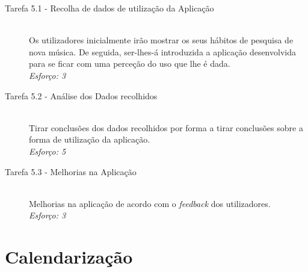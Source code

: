     \begin{description}
      \item[Tarefa 5.1 - Recolha de dados de utilização da Aplicação] \hfill \\
      Os utilizadores inicialmente irão mostrar os seus hábitos de pesquisa de nova música.
      De seguida, ser-lhes-á introduzida a aplicação desenvolvida para se ficar com uma perceção do uso que lhe é dada. \\
      \emph{Esforço: 3}

      \item[Tarefa 5.2 - Análise dos Dados recolhidos] \hfill \\
      Tirar conclusões dos dados recolhidos por forma a tirar conclusões sobre a forma de utilização da aplicação. \\
      \emph{Esforço: 5}

      \item[Tarefa 5.3 - Melhorias na Aplicação] \hfill \\
      Melhorias na aplicação de acordo com o \emph{feedback} dos utilizadores. \\
      \emph{Esforço: 3}

    \end{description}



\section{Calendarização} %
\label{sec:calendarizacao}

